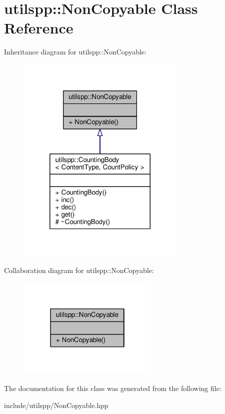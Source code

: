 \hypertarget{classutilspp_1_1NonCopyable}{\section{utilspp\-:\-:Non\-Copyable Class Reference}
\label{classutilspp_1_1NonCopyable}
}


Inheritance diagram for utilspp\-:\-:Non\-Copyable\-:\nopagebreak
\begin{figure}[H]
\begin{center}
\leavevmode
\includegraphics[width=228pt]{classutilspp_1_1NonCopyable__inherit__graph}
\end{center}
\end{figure}


Collaboration diagram for utilspp\-:\-:Non\-Copyable\-:\nopagebreak
\begin{figure}[H]
\begin{center}
\leavevmode
\includegraphics[width=190pt]{classutilspp_1_1NonCopyable__coll__graph}
\end{center}
\end{figure}


The documentation for this class was generated from the following file\-:\begin{DoxyCompactItemize}
\item 
include/utilspp/Non\-Copyable.\-hpp\end{DoxyCompactItemize}
